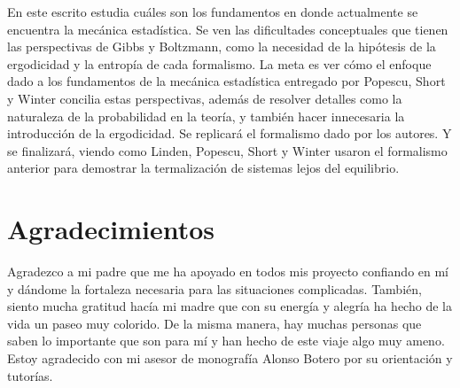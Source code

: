 \documentclass[11pt]{book}
\theoremstyle{definition}
\begin{document}
En este escrito estudia cuáles son los fundamentos en donde actualmente se encuentra la mecánica estadística. Se ven las dificultades conceptuales que tienen las perspectivas de Gibbs y Boltzmann, como la necesidad de la hipótesis de la ergodicidad y la entropía de cada formalismo. La meta es ver cómo el enfoque dado a los fundamentos de la mecánica estadística entregado por Popescu, Short y Winter \cite{Popescu2006} concilia estas perspectivas, además de resolver detalles como la naturaleza de la probabilidad en la teoría, y también hacer innecesaria la introducción de la ergodicidad. Se replicará el formalismo dado por los autores. Y se finalizará, viendo como Linden, Popescu, Short y Winter \cite{LindenPaper} usaron el formalismo anterior para demostrar la termalización de sistemas lejos del equilibrio.





\chapter*{Agradecimientos}
Agradezco a mi padre que me ha apoyado en todos mis proyecto confiando en mí y dándome la fortaleza necesaria para las situaciones complicadas. También, siento mucha gratitud hacía mi madre que con su energía y alegría ha hecho de la vida un paseo muy colorido. De la misma manera, hay muchas personas que saben lo importante que son para mí y han hecho de este viaje algo muy ameno. Estoy agradecido con mi asesor de monografía Alonso Botero por su orientación y tutorías.









\end{document}
